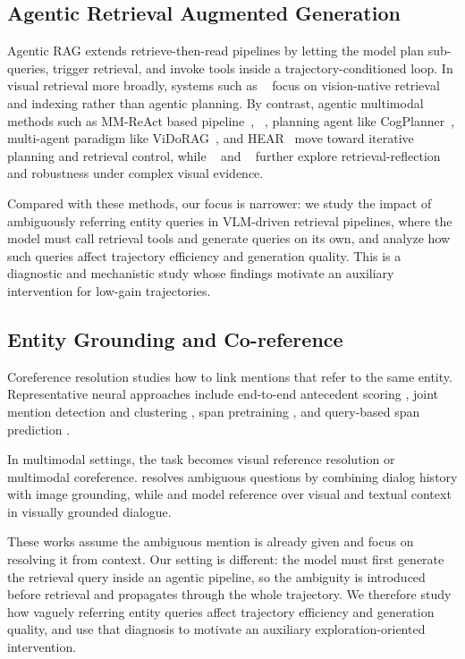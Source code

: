 \documentclass{article} %
\begin{document}
\subsection{Agentic Retrieval Augmented Generation}
Agentic RAG extends retrieve-then-read pipelines by letting the model plan sub-queries, trigger retrieval, and invoke tools inside a trajectory-conditioned loop. In visual retrieval more broadly, systems such as ~\citep{yu2025visrag,sun2025visrag} focus on vision-native retrieval and indexing rather than agentic planning. By contrast, agentic multimodal methods such as MM-ReAct based pipeline~\citep{yang2023mm}, ~\citep{li2024benchmarking}, planning agent like CogPlanner~\citep{yu2025cogplanner}, multi-agent paradigm like ViDoRAG~\citep{wang2025vidorag}, and HEAR~\citep{chen2025hear} move toward iterative planning and retrieval control, while ~\citep{zhang2024mr} and ~\citep{qi2024rora} further explore retrieval-reflection and robustness under complex visual evidence.

Compared with these methods, our focus is narrower: we study the impact of ambiguously referring entity queries in VLM-driven retrieval pipelines, where the model must call retrieval tools and generate queries on its own, and analyze how such queries affect trajectory efficiency and generation quality. This is a diagnostic and mechanistic study whose findings motivate an auxiliary intervention for low-gain trajectories.

\subsection{Entity Grounding and Co-reference}
Coreference resolution studies how to link mentions that refer to the same entity. Representative neural approaches include end-to-end antecedent scoring \citep{lee2017end}, joint mention detection and clustering \citep{zhang2018neural}, span pretraining \citep{joshi2020spanbert}, and query-based span prediction \citep{wu2020corefqa}.

In multimodal settings, the task becomes visual reference resolution or multimodal coreference. \citep{kang2019dual} resolves ambiguous questions by combining dialog history with image grounding, while \citep{guo2022gravl} and \citep{inadumi2025disambiguating} model reference over visual and textual context in visually grounded dialogue.

These works assume the ambiguous mention is already given and focus on resolving it from context. Our setting is different: the model must first generate the retrieval query inside an agentic pipeline, so the ambiguity is introduced before retrieval and propagates through the whole trajectory. We therefore study how vaguely referring entity queries affect trajectory efficiency and generation quality, and use that diagnosis to motivate an auxiliary exploration-oriented intervention.
\end{document}
